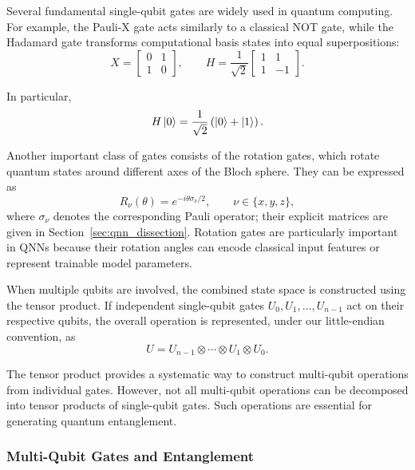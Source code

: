 \documentclass[12pt]{article}
\numberwithin{equation}{section}  %
\begin{document}
Several fundamental single-qubit gates are widely used in quantum computing. For example, the Pauli-X gate acts similarly to a classical NOT gate, while the Hadamard gate transforms computational basis states into equal superpositions:
\begin{equation}
    X=
    \begin{bmatrix}
        0&1\\1&0
    \end{bmatrix},
    \qquad
    H=\frac{1}{\sqrt{2}}
    \begin{bmatrix}
        1&1\\1&-1
    \end{bmatrix}.
\end{equation}

In particular,
\begin{equation}
    H\ket{0}
    =\frac{1}{\sqrt{2}}
    \left(\ket{0}+\ket{1}\right).
\end{equation}

Another important class of gates consists of the rotation gates, which rotate quantum states around different axes of the Bloch sphere. They can be expressed as
\begin{equation}
    R_{\nu}(\theta)
    =e^{-i\theta\sigma_{\nu}/2},
    \qquad \nu\in\{x,y,z\},
    \label{eq:rotation_gate}
\end{equation}
where $\sigma_{\nu}$ denotes the corresponding Pauli operator; their explicit matrices are given in Section~\ref{sec:qnn_dissection}. Rotation gates are particularly important in QNNs because their rotation angles can encode classical input features or represent trainable model parameters.

When multiple qubits are involved, the combined state space is constructed using the tensor product. If independent single-qubit gates $U_0,U_1,\ldots,U_{n-1}$ act on their respective qubits, the overall operation is represented, under our little-endian convention, as
\begin{equation}
    U=U_{n-1}\otimes\cdots\otimes U_1\otimes U_0.
    \label{eq:tensor_product_gates}
\end{equation}

The tensor product provides a systematic way to construct multi-qubit operations from individual gates. However, not all multi-qubit operations can be decomposed into tensor products of single-qubit gates. Such operations are essential for generating quantum entanglement.

\subsubsection{Multi-Qubit Gates and Entanglement}
\label{sec:entanglement}
\end{document}
